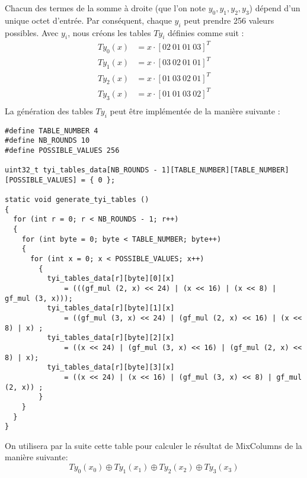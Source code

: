 \documentclass[a4paper, 10pt]{article}
\begin{document}
  Chacun des termes de la somme à droite (que l'on note \(y_{0}, y_{1}, y_{2}, y_{3}\)) dépend d'un unique octet 
  d'entrée. Par conséquent, chaque \(y_{i}\) peut prendre 256 valeurs possibles. Avec \(y_{i}\), nous créons les 
  tables \(Ty_{i}\) définies comme suit :
  \[
\begin{aligned}
Ty_{0}(x) &= x \cdot [02\ 01\ 01\ 03]^T \\
Ty_{1}(x) &= x \cdot [03\ 02\ 01\ 01]^T \\
Ty_{2}(x) &= x \cdot [01\ 03\ 02\ 01]^T \\
Ty_{3}(x) &= x \cdot [01\ 01\ 03\ 02]^T \\
\end{aligned}
\]
  La génération des tables \(Ty_{i}\) peut être implémentée de la manière suivante :
  
\scriptsize{
\begin{verbatim}
#define TABLE_NUMBER 4
#define NB_ROUNDS 10
#define POSSIBLE_VALUES 256

uint32_t tyi_tables_data[NB_ROUNDS - 1][TABLE_NUMBER][TABLE_NUMBER][POSSIBLE_VALUES] = { 0 };

static void generate_tyi_tables ()
{
  for (int r = 0; r < NB_ROUNDS - 1; r++) 
  {
    for (int byte = 0; byte < TABLE_NUMBER; byte++)
    {
      for (int x = 0; x < POSSIBLE_VALUES; x++)
        {
          tyi_tables_data[r][byte][0][x]
              = (((gf_mul (2, x) << 24) | (x << 16) | (x << 8) | gf_mul (3, x)));
          tyi_tables_data[r][byte][1][x]
              = ((gf_mul (3, x) << 24) | (gf_mul (2, x) << 16) | (x << 8) | x) ;
          tyi_tables_data[r][byte][2][x]
              = ((x << 24) | (gf_mul (3, x) << 16) | (gf_mul (2, x) << 8) | x);
          tyi_tables_data[r][byte][3][x]
              = ((x << 24) | (x << 16) | (gf_mul (3, x) << 8) | gf_mul (2, x)) ;
        }
    }
  }
}
\end{verbatim}
}
\normalsize
  On utilisera par la suite cette table pour calculer le résultat de MixColumns de la manière suivante:
  \[ Ty_{0}(x_{0}) \oplus Ty_{1}(x_{1}) \oplus Ty_{2}(x_{2}) \oplus Ty_{3}(x_{3})\]
\end{document}
